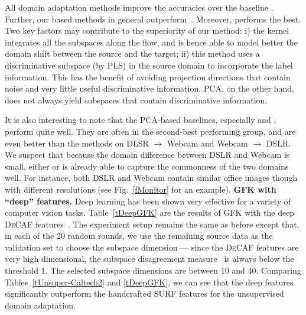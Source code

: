 All domain adaptation methods improve the accuracies over the baseline \OrigFeat. Further, our {\GFK} based methods in general outperform\ \ICCV.  Moreover, {\plsGEO} performs the best. Two key factors may contribute to the superiority of our method: i) the kernel integrates all the subspaces along the flow, and is hence able to model better the domain shift between the source and the target; ii) this method uses a discriminative subspace (by PLS) in the source domain to incorporate the label information. This has the benefit of avoiding projection directions that contain noise and very little useful discriminative information. PCA,  on the other hand, does not always yield subspaces that contain discriminative information. %


It is also interesting to note that the PCA-based baselines, especially {\PCAst} and {\PCAt}, perform quite well. They are often in the second-best performing group, and are even better than the {\ICCV} methods on DLSR $\rightarrow$ Webcam and Webcam $\rightarrow$ DSLR.  We suspect that because the domain difference between DSLR and Webcam is small, either {\PCAt} or {\PCAst} is already able to capture the commonness of the two domains well. For instance, both DSLR and Webcam contain similar office images though with different resolutions  (see Fig.~\ref{fMonitor} for an example). %
\newline \newline \noindent 
{\bf GFK with ``deep'' features.} Deep learning has been shown very effective for a variety of computer vision tasks. Table~\ref{tDeepGFK} are the results of GFK with the deep \textsc{DeCAF} features~\cite{DonahueX13Decaf}. The experiment setup remains the same as before except that, in each of the 20 random rounds, we use the remaining source data as the validation set to choose the subspace dimension --- since the \textsc{DeCAF} features are very high dimensional, the subspace disagreement measure~\cite{GongCVPR12Geodesic} is always below the threshold 1. The selected subspace dimensions are between 10 and 40. Comparing Tables~\ref{tUnsuper-Caltech2} and \ref{tDeepGFK}, we can see that the deep features significantly outperform the handcrafted SURF features for the unsupervised domain adaptation.


